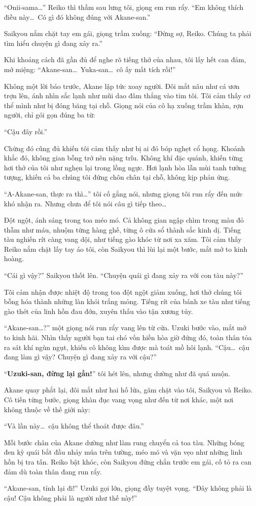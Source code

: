 \documentclass[../main.tex]{subfiles}
\begin{document}
``Onii-sama\dots'' Reiko thì thầm sau lưng tôi, giọng em run rẩy. ``Em không thích điều này\dots\ Có gì đó không đúng với Akane-san.''

Saikyou nắm chặt tay em gái, giọng trầm xuống: ``Đừng sợ, Reiko. Chúng ta phải tìm hiểu chuyện gì đang xảy ra.''

Khi khoảng cách đã gần đủ để nghe rõ tiếng thở của nhau, tôi lấy hết can đảm, mở miệng: ``Akane-san\dots\ Yuka-san\dots\ cô ấy mất tích rồi!''

Không một lời báo trước, Akane lập tức xoay người. Đôi mắt nâu như cá ươn trợn lên, ánh nhìn sắc lạnh như mũi dao đâm thẳng vào tim tôi. Tôi cảm thấy cơ thể mình như bị đóng băng tại chỗ. Giọng nói của cô hạ xuống trầm khàn, rợn người, chỉ gói gọn đúng ba từ:

``Cậu đây rồi.''

Chừng đó cũng đủ khiến tôi cảm thấy như bị ai đó bóp nghẹt cổ họng. Khoảnh khắc đó, không gian bỗng trở nên nặng trĩu. Không khí đặc quánh, khiến từng hơi thở của tôi như nghẹn lại trong lồng ngực. Hơi lạnh hòa lẫn mùi tanh tưởng tượng, khiến cả ba chúng tôi đứng chôn chân tại chỗ, không kịp phản ứng.

``A-Akane-san, thực ra thì\dots'' tôi cố gắng nói, nhưng giọng tôi run rẩy đến mức khó nhận ra. Nhưng chưa để tôi nói câu gì tiếp theo\dots\

Đột ngột, ánh sáng trong toa méo mó. Cả không gian ngập chìm trong màu đỏ thẫm như máu, nhuộm từng hàng ghế, từng ô cửa sổ thành sắc kinh dị. Tiếng tàu nghiến rít càng vang dội, như tiếng gào khóc từ nơi xa xăm. Tôi cảm thấy Reiko nắm chặt lấy tay áo tôi, còn Saikyou thì lùi lại một bước, mắt mở to kinh hoàng.

``Cái gì vậy?'' Saikyou thốt lên. ``Chuyện quái gì đang xảy ra với con tàu này?''

Tôi cảm nhận được nhiệt độ trong toa đột ngột giảm xuống, hơi thở chúng tôi bỗng hóa thành những làn khói trắng mỏng. Tiếng rít của bánh xe tàu như tiếng gào thét của linh hồn đau đớn, xuyên thấu vào tận xương tủy.


``Akane-san\dots?'' một giọng nói run rẩy vang lên từ cửa. Uzuki bước vào, mắt mở to kinh hãi. Nhìn thấy người bạn tai chó vốn hiền hòa giờ đứng đó, toàn thân tỏa ra sát khí ngùn ngụt, khiến cô không kìm được mà toát mồ hôi lạnh. ``Cậu\dots\ cậu đang làm gì vậy? Chuyện gì đang xảy ra với cậu?''

``\textbf{Uzuki-san, đừng lại gần!}'' tôi hét lên, nhưng dường như đã quá muộn.

Akane quay phắt lại, đôi mắt như hai hố lửa, găm chặt vào tôi, Saikyou và Reiko. Cô tiến từng bước, giọng khàn đục vang vọng như đến từ nơi khác, một nơi không thuộc về thế giới này:

``Và lần này\dots\ cậu không thể thoát được đâu.''

Mỗi bước chân của Akane dường như làm rung chuyển cả toa tàu. Những bóng đen kỳ quái bắt đầu nhảy múa trên tường, méo mó và vặn vẹo như những linh hồn bị tra tấn. Reiko bật khóc, còn Saikyou đứng chắn trước em gái, cố tỏ ra can đảm dù toàn thân đang run rẩy.

``Akane-san, tỉnh lại đi!'' Uzuki gọi lớn, giọng đầy tuyệt vọng. ``Đây không phải là cậu! Cậu không phải là người như thế này!''
\end{document}
